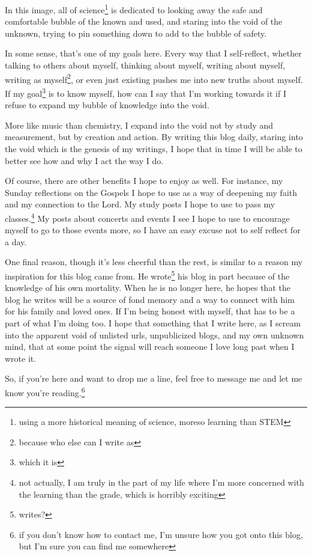 \documentclass[12pt]{article}[titlepage]
\newcommand{\1}{\={a}}
\newcommand{\2}{\={e}}
\newcommand{\3}{\={\i}}
\newcommand{\4}{\=o}
\newcommand{\5}{\=u}
\newcommand{\6}{\={A}}
\renewcommand{\,}{\textsuperscript{,}}
\begin{document}
In this image, all of science\footnote{using a more historical meaning of science, moreso learning than STEM} is dedicated to looking away the safe and comfortable bubble of the known and used, and staring into the void of the unknown, trying to pin something down to add to the bubble of safety.

In some sense, that's one of my goals here.
Every way that I self-reflect, whether talking to others about myself, thinking about myself, writing about myself, writing as myself\footnote{because who else can I write as}, or even just existing pushes me into new truths about myself.
If my goal\footnote{which it is} is to know myself, how can I say that I'm working towards it if I refuse to expand my bubble of knowledge into the void.

More like music than chemistry, I expand into the void not by study and measurement, but by creation and action.
By writing this blog daily, staring into the void which is the genesis of my writings, I hope that in time I will be able to better see how and why I act the way I do.

Of course, there are other benefits I hope to enjoy as well.
For instance, my Sunday reflections on the Gospels I hope to use as a way of deepening my faith and my connection to the Lord.
My study posts I hope to use to pass my classes.\footnote{not actually, I am truly in the part of my life where I'm more concerned with the learning than the grade, which is horribly exciting}
My posts about concerts and events I see I hope to use to encourage myself to go to those events more, so I have an easy excuse not to self reflect for a day.

One final reason, though it's less cheerful than the rest, is similar to a reason my inspiration for this blog came from.
He wrote\footnote{writes?} his blog in part because of the knowledge of his own mortality.
When he is no longer here, he hopes that the blog he writes will be a source of fond memory and a way to connect with him for his family and loved ones.
If I'm being honest with myself, that has to be a part of what I'm doing too.
I hope that something that I write here, as I scream into the apparent void of unlisted urls, unpublicized blogs, and my own unknown mind, that at some point the signal will reach someone I love long past when I wrote it.

So, if you're here and want to drop me a line, feel free to message me and let me know you're reading.\footnote{if you don't know how to contact me, I'm unsure how you got onto this blog, but I'm sure you can find me somewhere}
\end{document}
